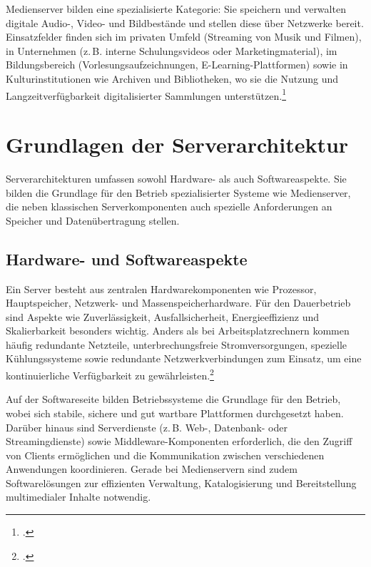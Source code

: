 \documentclass[12pt,a4paper]{report}
\begin{document}
  Medienserver bilden eine spezialisierte Kategorie: Sie speichern und verwalten
  digitale Audio-, Video- und Bildbestände und stellen diese über Netzwerke bereit.
  Einsatzfelder finden sich im privaten Umfeld (Streaming von Musik und Filmen),
  in Unternehmen (z.\,B. interne Schulungsvideos oder Marketingmaterial),
  im Bildungsbereich (Vorlesungsaufzeichnungen, E-Learning-Plattformen) sowie
  in Kulturinstitutionen wie Archiven und Bibliotheken, wo sie die Nutzung und
  Langzeitverfügbarkeit digitalisierter Sammlungen unterstützen.\footcite[Vgl.][S.~131~ff.]{steinmetz_multimedia}

\section{Grundlagen der Serverarchitektur}
Serverarchitekturen umfassen sowohl Hardware- als auch Softwareaspekte. 
Sie bilden die Grundlage für den Betrieb spezialisierter Systeme wie Medienserver, 
die neben klassischen Serverkomponenten auch spezielle Anforderungen an Speicher und Datenübertragung stellen.

  \subsection{Hardware- und Softwareaspekte}
  Ein Server besteht aus zentralen Hardwarekomponenten wie Prozessor, Hauptspeicher, Netzwerk- und Massenspeicherhardware. 
  Für den Dauerbetrieb sind Aspekte wie Zuverlässigkeit, Ausfallsicherheit, Energieeffizienz und Skalierbarkeit besonders wichtig. 
  Anders als bei Arbeitsplatzrechnern kommen häufig redundante Netzteile, unterbrechungsfreie Stromversorgungen, 
  spezielle Kühlungssysteme sowie redundante Netzwerkverbindungen zum Einsatz, 
  um eine kontinuierliche Verfügbarkeit zu gewährleisten.\footcite[Vgl.][S.~152541]{ahmed2021energy} 


  Auf der Softwareseite bilden Betriebssysteme die Grundlage für den Betrieb, 
  wobei sich stabile, sichere und gut wartbare Plattformen durchgesetzt haben. 
  Darüber hinaus sind Serverdienste (z.\,B. Web-, Datenbank- oder Streamingdienste) 
  sowie Middleware-Komponenten erforderlich, die den Zugriff von Clients ermöglichen 
  und die Kommunikation zwischen verschiedenen Anwendungen koordinieren. 
  Gerade bei Medienservern sind zudem Softwarelösungen zur effizienten Verwaltung, 
  Katalogisierung und Bereitstellung multimedialer Inhalte notwendig.
\end{document}
